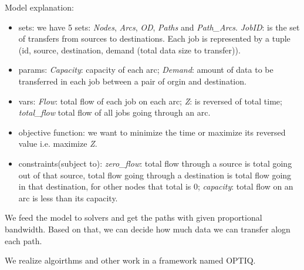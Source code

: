 Model explanation:
\begin{itemize}
\item sets: we have 5 sets: \textit{Nodes}, \textit{Arcs}, \textit{OD}, \textit{Paths} and \textit{Path\_Arcs}. \textit{JobID}: is the set of transfers from sources to destinations. Each job is represented by a tuple (id, source, destination, demand (total data size to transfer)).
\item params: {\it Capacity}: capacity of each arc; {\it Demand}: amount of data to be transferred in each job between a pair of orgin and destination.
\item vars: \textit{Flow}: total flow of each job on each arc; \textit{Z}: is reversed of total time; \textit{total\_flow} total flow of all jobs going through an arc.
\item objective function: we want to minimize the time or maximize its reversed value i.e. maximize \textit{Z}.
\item constraints(subject to): \textit{zero\_flow}: total flow through a source is total going out of that source, total flow going through a destination is total flow going in that destination, for other nodes that total is 0; \textit{capacity}: total flow on an arc is less than its capacity.
\end{itemize}

We feed the model to solvers and get the paths with given proportional bandwidth. Based on that, we can decide how much data we can transfer alogn each path.

\begin{comment}
So far, we have presented different algorithms/approaches. Each has its own use case scenario. The Table \ref{tbl:approaches} describes the situation when to use each of them. 

\begin{table}[h]

\begin{center}
    \begin{tabular}{ | p{0.8cm} | p{2cm} | p{2cm} | p{2cm} |}
    \hline
     & BFS-based &  \multicolumn{2}{ c| }{Path-based} \\ \hline
     & Heuristics 1 & Heuristics 2 & Optimization Model \\ \hline
    Time Complexity & $O$(K * ($|$V$|$ + $|$E$|$)) & $O$(K * (Time complexity of the algrithms used to get k shortest paths)) & $O$(K * (Time complexity of the algrithms used to get k shortest paths) + Solving time) \\ \hline
    When to use & Very dense communication & Sparse comminication &  Medium dense where proportional throughtput can be gained \\
    \hline
    \end{tabular}

    \caption{Approaches: time complexity and usage}
    \label{tbl:approaches}

\end{center}
\end{table}

\end{comment}

We realize algoirthms and other work in a framework named OPTIQ.
